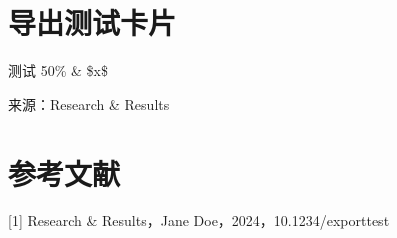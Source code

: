 \documentclass{article}
\begin{document}
\section*{导出测试卡片}

测试 50\% \& \$x\$

来源：Research \& Results

\section*{参考文献}

[1] Research \& Results，Jane Doe，2024，10.1234/exporttest\\
\end{document}

